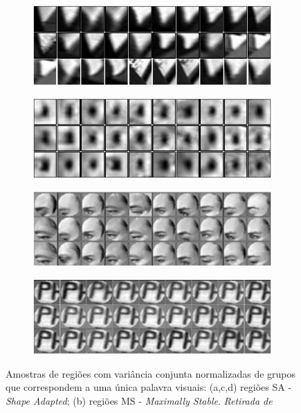 \begin{figure}[h]
	\centering
	\begin{subfigure}[b]{0.4\textwidth}
		\includegraphics[width=\textwidth]{./figures/visual_word_1}
		\caption{ }
	\end{subfigure}
	\quad
	\begin{subfigure}[b]{0.4\textwidth}
		\includegraphics[width=\textwidth]{./figures/visual_word_2}
		\caption{ }
	\end{subfigure}
	
	\begin{subfigure}[b]{0.4\textwidth}
		\includegraphics[width=\textwidth]{./figures/visual_word_3}
		\caption{ }
	\end{subfigure}
	\quad
	\begin{subfigure}[b]{0.4\textwidth}
		\includegraphics[width=\textwidth]{./figures/visual_word_4}
		\caption{ }
	\end{subfigure}
	\caption{Amostras de regiões com variância conjunta normalizadas de grupos que correspondem a uma única palavra visuais: (a,c,d) regiões SA - \textit{Shape Adapted}; (b) regiões MS - \textit{Maximally Stable}.  \textit{Retirada de}~\cite{Sivic2006}}
	\label{fig:visual_word}
\end{figure}

